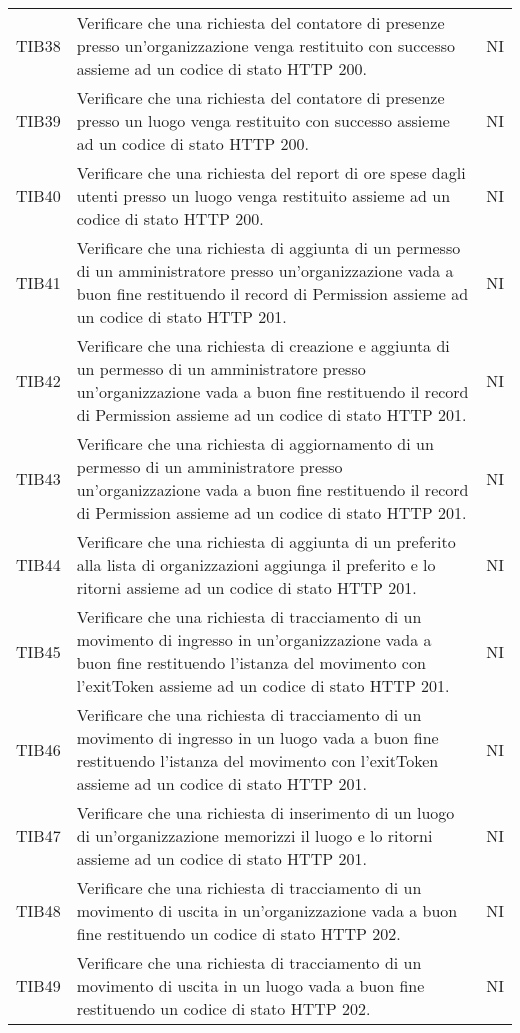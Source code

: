 {\begin{longtable}{ c C{13cm} C{1cm}}
TIB38 & Verificare che una richiesta del contatore di presenze presso un'organizzazione venga restituito con successo assieme ad un codice di stato HTTP 200. & NI \\
TIB39 & Verificare che una richiesta del contatore di presenze presso un luogo venga restituito con successo assieme ad un codice di stato HTTP 200. & NI \\
TIB40 & Verificare che una richiesta del report di ore spese dagli utenti presso un luogo venga restituito assieme ad un codice di stato HTTP 200. & NI \\
TIB41 & Verificare che una richiesta di aggiunta di un permesso di un amministratore presso un'organizzazione vada a buon fine restituendo il record di Permission assieme ad un codice di stato HTTP 201. & NI \\
TIB42 & Verificare che una richiesta di creazione e aggiunta di un permesso di un amministratore presso un'organizzazione vada a buon fine restituendo il record di Permission assieme ad un codice di stato HTTP 201. & NI \\
TIB43 & Verificare che una richiesta di aggiornamento di un permesso di un amministratore presso un'organizzazione vada a buon fine restituendo il record di Permission assieme ad un codice di stato HTTP 201. & NI \\
TIB44 & Verificare che una richiesta di aggiunta di un preferito alla lista di organizzazioni aggiunga il preferito e lo ritorni assieme ad un codice di stato HTTP 201. & NI \\
TIB45 & Verificare che una richiesta di tracciamento di un movimento di ingresso in un'organizzazione vada a buon fine restituendo l'istanza del movimento con l'exitToken assieme ad un codice di stato HTTP 201. & NI \\
TIB46 & Verificare che una richiesta di tracciamento di un movimento di ingresso in un luogo vada a buon fine restituendo l'istanza del movimento con l'exitToken assieme ad un codice di stato HTTP 201. & NI \\
TIB47 & Verificare che una richiesta di inserimento di un luogo di un'organizzazione memorizzi il luogo e lo ritorni assieme ad un codice di stato HTTP 201. & NI \\
TIB48 & Verificare che una richiesta di tracciamento di un movimento di uscita in un'organizzazione vada a buon fine restituendo un codice di stato HTTP 202. & NI \\
TIB49 & Verificare che una richiesta di tracciamento di un movimento di uscita in un luogo vada a buon fine restituendo un codice di stato HTTP 202. & NI \\

\end{longtable}}
